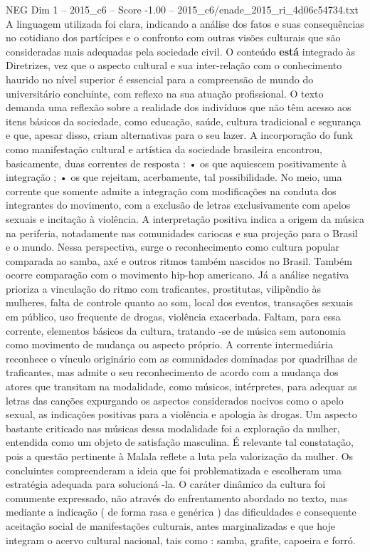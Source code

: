\begin{textsample}{NEG Dim 1 – 2015\_c6 – Score -1.00 – 2015\_c6/enade\_2015\_ri\_4d06c54734.txt}
A linguagem utilizada foi clara, indicando a análise dos fatos e suas consequências no cotidiano dos partícipes e o confronto com outras visões culturais que são consideradas mais adequadas pela sociedade civil.
O conteúdo \textbf{está} integrado às Diretrizes, vez que o aspecto cultural e sua inter-relação com o conhecimento haurido no nível superior é essencial para a compreensão de mundo do universitário concluinte, com reflexo na sua atuação profissional.
O texto demanda uma reflexão sobre a realidade dos indivíduos que não têm acesso aos itens básicos da sociedade, como educação, saúde, cultura tradicional e segurança e que, apesar disso, criam alternativas para o seu lazer.
A incorporação do funk como manifestação cultural e artística da sociedade brasileira encontrou, basicamente, duas correntes de resposta : • os que aquiescem positivamente à integração ; • os que rejeitam, acerbamente, tal possibilidade.
No meio, uma corrente que somente admite a integração com modificações na conduta dos integrantes do movimento, com a exclusão de letras exclusivamente com apelos sexuais e incitação à violência.
A interpretação positiva indica a origem da música na periferia, notadamente nas comunidades cariocas e sua projeção para o Brasil e o mundo.
Nessa perspectiva, surge o reconhecimento como cultura popular comparada ao samba, axé e outros ritmos também nascidos no Brasil.
Também ocorre comparação com o movimento hip-hop americano.
Já a análise negativa prioriza a vinculação do ritmo com traficantes, prostitutas, vilipêndio às mulheres, falta de controle quanto ao som, local dos eventos, transações sexuais em público, uso frequente de drogas, violência exacerbada.
Faltam, para essa corrente, elementos básicos da cultura, tratando -se de música sem autonomia como movimento de mudança ou aspecto próprio.
A corrente intermediária reconhece o vínculo originário com as comunidades dominadas por quadrilhas de traficantes, mas admite o seu reconhecimento de acordo com a mudança dos atores que transitam na modalidade, como músicos, intérpretes, para adequar as letras das canções expurgando os aspectos considerados nocivos como o apelo sexual, as indicações positivas para a violência e apologia às drogas.
Um aspecto bastante criticado nas músicas dessa modalidade foi a exploração da mulher, entendida como um objeto de satisfação masculina.
É relevante tal constatação, pois a questão pertinente à Malala reflete a luta pela valorização da mulher.
Os concluintes compreenderam a ideia que foi problematizada e escolheram uma estratégia adequada para solucioná -la.
O caráter dinâmico da cultura foi comumente expressado, não através do enfrentamento abordado no texto, mas mediante a indicação ( de forma rasa e genérica ) das dificuldades e consequente aceitação social de manifestações culturais, antes marginalizadas e que hoje integram o acervo cultural nacional, tais como : samba, grafite, capoeira e forró.

\end{textsample}
